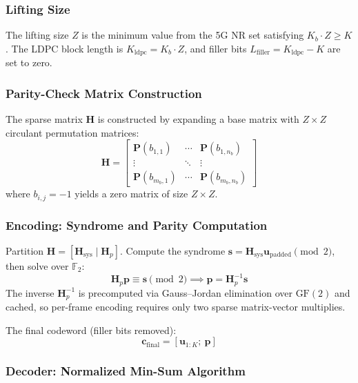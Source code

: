 \documentclass[12pt, a4paper]{article}
\begin{document}
\subsubsection{Lifting Size}
The lifting size $Z$ is the minimum value from the 5G NR set satisfying $K_b \cdot Z \geq K$. The LDPC block length is $K_{\text{ldpc}} = K_b \cdot Z$, and filler bits $L_{\text{filler}} = K_{\text{ldpc}} - K$ are set to zero.

\subsubsection{Parity-Check Matrix Construction}
The sparse matrix $\mathbf{H}$ is constructed by expanding a base matrix with $Z\times Z$ circulant permutation matrices:
\begin{equation}
\mathbf{H} =
\begin{bmatrix}
\mathbf{P}(b_{1,1}) & \cdots & \mathbf{P}(b_{1,n_b}) \\
\vdots & \ddots & \vdots \\
\mathbf{P}(b_{m_b,1}) & \cdots & \mathbf{P}(b_{m_b,n_b})
\end{bmatrix}
\end{equation}
where $b_{i,j}=-1$ yields a zero matrix of size $Z\times Z$.

\subsubsection{Encoding: Syndrome and Parity Computation}
Partition $\mathbf{H} = [\mathbf{H}_{\text{sys}} \mid \mathbf{H}_p]$. Compute the syndrome $\mathbf{s} = \mathbf{H}_{\text{sys}}\mathbf{u}_{\text{padded}} \pmod{2}$, then solve over $\mathbb{F}_2$:
\begin{equation}
\mathbf{H}_p\mathbf{p} \equiv \mathbf{s} \pmod{2} \implies \mathbf{p} = \mathbf{H}_p^{-1}\mathbf{s}
\end{equation}
The inverse $\mathbf{H}_p^{-1}$ is precomputed via Gauss--Jordan elimination over $\text{GF}(2)$ and cached, so per-frame encoding requires only two sparse matrix-vector multiplies.

The final codeword (filler bits removed):
\begin{equation}
\mathbf{c}_{\text{final}} = [\mathbf{u}_{1:K};\ \mathbf{p}]
\end{equation}

\subsubsection{Decoder: Normalized Min-Sum Algorithm}
\end{document}
